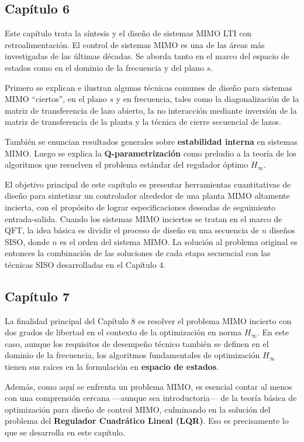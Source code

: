 \subsection{Capítulo 6}
Este capítulo trata la síntesis y el diseño de sistemas MIMO LTI con retroalimentación. El control de sistemas MIMO es una de las áreas más investigadas de las últimas décadas. Se aborda tanto en el marco del espacio de estados como en el dominio de la frecuencia y del plano \(s\).

Primero se explican e ilustran algunas técnicas comunes de diseño para sistemas MIMO “ciertos”, en el plano \(s\) y en frecuencia, tales como la diagonalización de la matriz de transferencia de lazo abierto, la no interacción mediante inversión de la matriz de transferencia de la planta y la técnica de cierre secuencial de lazos.

También se enuncian resultados generales sobre \textbf{estabilidad interna} en sistemas MIMO. Luego se explica la \textbf{Q-parametrización} como preludio a la teoría de los algoritmos que resuelven el problema estándar del regulador óptimo \(H_{\infty}\).

El objetivo principal de este capítulo es presentar herramientas cuantitativas de diseño para sintetizar un controlador alrededor de una planta MIMO altamente incierta, con el propósito de lograr especificaciones deseadas de seguimiento entrada-salida. Cuando los sistemas MIMO inciertos se tratan en el marco de QFT, la idea básica es dividir el proceso de diseño en una secuencia de \(n\) diseños SISO, donde \(n\) es el orden del sistema MIMO. La solución al problema original es entonces la combinación de las soluciones de cada etapa secuencial con las técnicas SISO desarrolladas en el Capítulo 4.

\subsection{Capítulo 7}
La finalidad principal del Capítulo 8 es resolver el problema MIMO incierto con dos grados de libertad en el contexto de la optimización en norma \(H_{\infty}\). En este caso, aunque los requisitos de desempeño técnico también se definen en el dominio de la frecuencia, los algoritmos fundamentales de optimización \(H_{\infty}\) tienen sus raíces en la formulación en \textbf{espacio de estados}.

Además, como aquí se enfrenta un problema MIMO, es esencial contar al menos con una comprensión cercana —aunque sea introductoria— de la teoría básica de optimización para diseño de control MIMO, culminando en la solución del problema del \textbf{Regulador Cuadrático Lineal (LQR)}. Eso es precisamente lo que se desarrolla en este capítulo.


